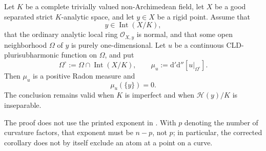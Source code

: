 
\begin{lemma}
\label{lem:p213-trivial-gauss-rigid-zero-atom}
Let $K$ be a complete trivially valued non-Archimedean field, let $X$ be
a good separated strict $K$-analytic space, and let $y\in X$ be a rigid
point.  Assume that
\[
                         y\in\operatorname{Int}(X/K),
\]
that the ordinary analytic local ring $\mathcal O_{X,y}$ is normal, and
that some open neighborhood $\Omega$ of $y$ is purely one-dimensional.
Let $u$ be a continuous CLD-plurisubharmonic function on $\Omega$, and put
\[
 \Omega^\circ:=\Omega\cap\operatorname{Int}(X/K),
 \qquad
 \mu_u:=\mathrm d'\mathrm d''[u|_{\Omega^\circ}].
\]
Then $\mu_u$ is a positive Radon measure and
\begin{equation}
\label{eq:p213-trivial-gauss-rigid-zero-atom}
                         \mu_u(\{y\})=0.
\end{equation}
The conclusion remains valid when $K$ is imperfect and when
$\mathscr H(y)/K$ is inseparable.
\end{lemma}

\begin{remark}
\label{rem:p213-trivial-gauss-rigid-zero-atom-index}
The proof does not use the printed exponent in
\cite[Corollary~16.8.6]{CLD25}.  With $p$ denoting the number of curvature
factors, that exponent must be $n-p$, not $p$; in particular, the corrected
corollary does not by itself exclude an atom at a point on a curve.
\end{remark}
